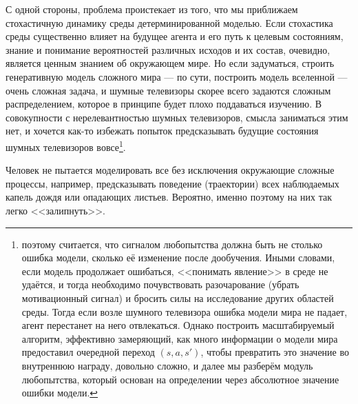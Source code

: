 С одной стороны, проблема проистекает из того, что мы приближаем стохастичную динамику среды детерминированной моделью. Если стохастика среды существенно влияет на будущее агента и его путь к целевым состояниям, знание и понимание вероятностей различных исходов и их состав, очевидно, является ценным знанием об окружающем мире. Но если задуматься, строить генеративную модель сложного мира --- по сути, построить модель вселенной --- очень сложная задача, и шумные телевизоры скорее всего задаются сложным распределением, которое в принципе будет плохо поддаваться изучению. В совокупности с нерелевантностью шумных телевизоров, смысла заниматься этим нет, и хочется как-то избежать попыток предсказывать будущие состояния шумных телевизоров вовсе\footnote{поэтому считается, что сигналом любопытства должна быть не столько ошибка модели, сколько её изменение после дообучения. Иными словами, если модель продолжает ошибаться, <<понимать явление>> в среде не удаётся, и тогда необходимо почувствовать разочарование (убрать мотивационный сигнал) и бросить силы на исследование других областей среды. Тогда если возле шумного телевизора ошибка модели мира не падает, агент перестанет на него отвлекаться. Однако построить масштабируемый алгоритм, эффективно замеряющий, как много информации о модели мира предоставил очередной переход $(s, a, s')$, чтобы превратить это значение во внутреннюю награду, довольно сложно, и далее мы разберём модуль любопытства, который основан на определении через абсолютное значение ошибки модели.}.

\begin{example}
Человек не пытается моделировать все без исключения окружающие сложные процессы, например, предсказывать поведение (траектории) всех наблюдаемых капель дождя или опадающих листьев. Вероятно, именно поэтому на них так легко <<залипнуть>>.
\end{example}



